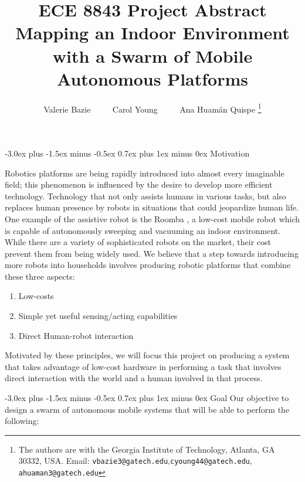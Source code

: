 \documentclass[conference]{IEEEtran}
\author{ Valerie Bazie $\quad\quad$ Carol Young $\quad\quad$ Ana Huam\'an Quispe%
	\thanks{The authors are with the Georgia Institute of
	Technology, Atlanta, GA 30332, USA. Email:
	{\tt\small vbazie3@gatech.edu},{\tt\small cyoung44@gatech.edu},
	{\tt\small ahuaman3@gatech.edu} }}
\title{ {ECE 8843} {P}roject {A}bstract  \\ {M}apping an Indoor Environment with a {S}warm of {M}obile {A}utonomous {P}latforms }
\makeatletter
\renewcommand\section{\@startsection{section}{1}{\z@}
                                  {-3.0ex plus -1.5ex minus -0.5ex}
                                  {0.7ex plus 1ex minus 0ex}
                                  {\bfseries}}
\makeatother
\begin{document}
\maketitle
\section{Motivation}

Robotics platforms are being rapidly introduced into almost every imaginable field; this phenomenon is influenced by the desire to develop more efficient technology. Technology that not only assists humans in various tasks, but also replaces human presence by robots in situations that could jeopardize human life. One example of the assistive robot is the
Roomba%
, a low-cost mobile robot which is capable of
autonomously sweeping and vacuuming an indoor environment. 
While there are a variety of sophisticated robots on
the market, their cost prevent them from being widely 
used. We believe that a step towards introducing
more robots into households involves producing robotic
platforms that combine these three aspects: 

\begin{enumerate}
\item{ Low-costs } 
\item{ Simple yet useful sensing/acting capabilities }
\item{ Direct Human-robot interaction }
\end{enumerate}

Motivated by these principles, we will focus this project on
producing a system that takes advantage of low-cost
hardware in performing a task that involves direct interaction
with the world and a human involved in that process.


\section{Goal}
\label{sec:Goal}
Our objective to design a swarm of autonomous mobile
systems that will be able to perform the following:
\end{document}

